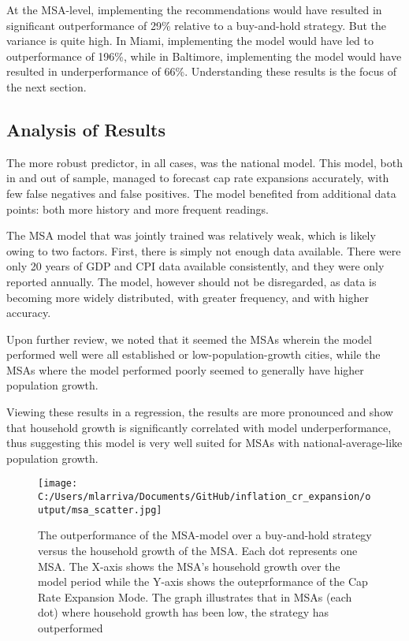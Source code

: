 \documentclass[jrfm,article,submit,oneauthor,pdftex]{Definitions/mdpi}
\begin{document}
At the MSA-level, implementing the recommendations would have resulted in significant outperformance of 29\% relative to a buy-and-hold strategy. But the variance is quite high. In Miami, implementing the model would have led to outperformance of 196\%, while in Baltimore, implementing the model would have resulted in underperformance of 66\%. Understanding these results is the  focus of the next section.

\pagebreak

\subsection{Analysis of Results}

The more robust predictor, in all cases, was the national model. This model, both in and out of sample, managed to forecast cap rate expansions accurately, with few false negatives and false positives. The model benefited from additional data points: both more history and more frequent readings. 

The MSA model that was jointly trained was relatively weak, which is likely owing to two factors. First, there is simply not enough data available. There were only 20 years of GDP and CPI data available consistently, and they were only reported annually. The model, however should not be disregarded, as data is becoming more widely distributed, with greater frequency, and with higher accuracy.

Upon further review, we noted that it seemed the MSAs wherein the model performed well were all established or low-population-growth cities, while the MSAs where the model performed poorly seemed to generally have higher population growth. 

Viewing these results in a regression, the results are more pronounced and show that household growth is significantly correlated with model underperformance, thus suggesting this model is very well suited for MSAs with national-average-like population growth. 

\begin{figure}[H]
\texttt{[image: C:/Users/mlarriva/Documents/GitHub/inflation\_cr\_expansion/output/msa\_scatter.jpg]}
\caption{The outperformance of the MSA-model over a buy-and-hold strategy versus the household growth of the MSA. Each dot represents one MSA. The X-axis shows the MSA's household growth over the model period while the Y-axis shows the outeprformance of the Cap Rate Expansion Mode. The graph illustrates that in MSAs (each dot) where household growth has been low, the strategy has outperformed \label{fig1}}
\end{figure}
\end{document}
